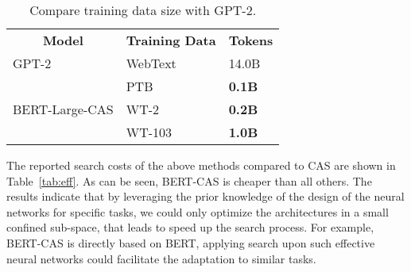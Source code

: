 \documentclass[11pt,a4paper]{article}
\begin{document}
\begin{table}[]
\centering
\begin{tabular}{|l|l|l|}
\hline
\multicolumn{1}{|c|}{\multirow{3}{*}{\textbf{Model}}} & \multirow{3}{*}{\textbf{Training Data}} & \multirow{3}{*}{\textbf{Tokens}} \\
\multicolumn{1}{|c|}{}                                &                                         &                                  \\
\multicolumn{1}{|c|}{}                                &                                         &                                  \\ \hline
GPT-2                                                 & WebText                                 & 14.0B                              \\ \hline
\multirow{3}{*}{BERT-Large-CAS}                 & PTB                                     & {\bf 0.1B}                             \\ \cline{2-3} 
                                                      & WT-2                                    & {\bf 0.2B}                             \\ \cline{2-3} 
                                                      & WT-103                                  & {\bf 1.0B}                           \\ \hline
\end{tabular}
\caption{Compare training data size with GPT-2.}
\label{tab:compgpt2data}
\end{table}

The reported search costs of the above methods compared to CAS are shown in Table~\ref{tab:eff}. As can be seen, BERT-CAS is cheaper than all others. The results indicate that by leveraging the prior knowledge of the design of the neural networks for specific tasks, we could only optimize the architectures in a small confined sub-space, that leads to speed up the search process. 
For example, BERT-CAS is directly based on BERT, applying search upon such effective neural networks could facilitate the adaptation to similar tasks.
\end{document}
